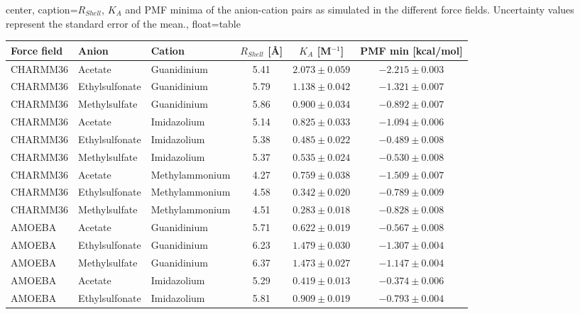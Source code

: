 \documentclass[journal=jacsat,articletitle=true,manuscript=suppinfo,layout=onecolumn]{achemso}
\begin{document}
    
    \begin{adjustbox}{center, caption={$R_{Shell}$, $K_{A}$ and PMF minima of the anion-cation pairs as simulated in the different force fields. Uncertainty values represent the standard error of the mean.}, float=table}
    \label{tab:Ka_data}
    \centering
    \renewcommand{\arraystretch}{0.68}
    \begin{tabular}{l | l | l | c | c | c }
    Force field    & Anion          & Cation          & $R_{Shell}$ [\AA] & $K_{A}$ [M$^{-1}$] & PMF min [kcal/mol] \\
    \hline
    CHARMM36       & Acetate        & Guanidinium     & 5.41  & $2.073 \pm 0.059$ & $-2.215 \pm 0.003$ \\
    CHARMM36       & Ethylsulfonate & Guanidinium     & 5.79  & $1.138 \pm 0.042$ & $-1.321 \pm 0.007$ \\
    CHARMM36       & Methylsulfate  & Guanidinium     & 5.86  & $0.900 \pm 0.034$ & $-0.892 \pm 0.007$ \\
    CHARMM36       & Acetate        & Imidazolium     & 5.14  & $0.825 \pm 0.033$ & $-1.094 \pm 0.006$ \\
    CHARMM36       & Ethylsulfonate & Imidazolium     & 5.38  & $0.485 \pm 0.022$ & $-0.489 \pm 0.008$ \\
    CHARMM36       & Methylsulfate  & Imidazolium     & 5.37  & $0.535 \pm 0.024$ & $-0.530 \pm 0.008$ \\
    CHARMM36       & Acetate        & Methylammonium  & 4.27  & $0.759 \pm 0.038$ & $-1.509 \pm 0.007$ \\
    CHARMM36       & Ethylsulfonate & Methylammonium  & 4.58  & $0.342 \pm 0.020$ & $-0.789 \pm 0.009$ \\
    CHARMM36       & Methylsulfate  & Methylammonium  & 4.51  & $0.283 \pm 0.018$ & $-0.828 \pm 0.008$ \\ \hline
    AMOEBA         & Acetate        & Guanidinium     & 5.71  & $0.622 \pm 0.019$ & $-0.567 \pm 0.008$ \\
    AMOEBA         & Ethylsulfonate & Guanidinium     & 6.23  & $1.479 \pm 0.030$ & $-1.307 \pm 0.004$ \\
    AMOEBA         & Methylsulfate  & Guanidinium     & 6.37  & $1.473 \pm 0.027$ & $-1.147 \pm 0.004$ \\
    AMOEBA         & Acetate        & Imidazolium     & 5.29  & $0.419 \pm 0.013$ & $-0.374 \pm 0.006$ \\
    AMOEBA         & Ethylsulfonate & Imidazolium     & 5.81  & $0.909 \pm 0.019$ & $-0.793 \pm 0.004$ \\

\end{tabular}
\end{adjustbox}
\end{document}
